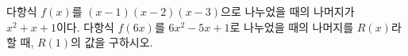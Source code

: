 다항식 $f(x)$를 $(x-1)(x-2)(x-3)$으로 나누었을 때의 나머지가 $x^2+x+1$이다. 다항식 $f(6x)$를 $6x^2-5x+1$로 나누었을 때의 나머지를 $R(x)$라 할 때, $R(1)$의 값을 구하시오.
